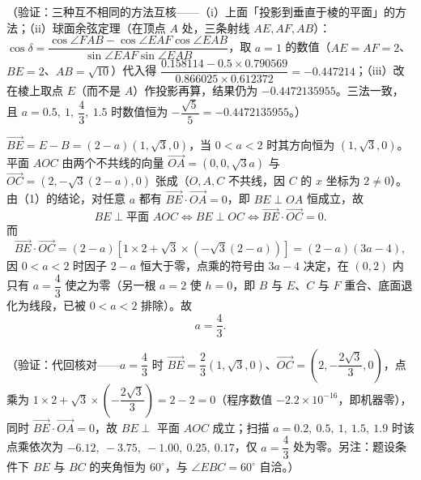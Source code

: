 \begin{answer}
（验证：三种互不相同的方法互核——（i）上面「投影到垂直于棱的平面」的方法；（ii）球面余弦定理（在顶点 \(A\) 处，三条射线 \(AE,AF,AB\)）：\(\cos\delta=\dfrac{\cos\angle FAB-\cos\angle EAF\cos\angle EAB}{\sin\angle EAF\sin\angle EAB}\)，取 \(a=1\) 的数值（\(AE=AF=2\)、\(BE=2\)、\(AB=\sqrt{10}\)）代入得 \(\dfrac{0.158114-0.5\times0.790569}{0.866025\times0.612372}=-0.447214\)；（iii）改在棱上取点 \(E\)（而不是 \(A\)）作投影再算，结果仍为 \(-0.4472135955\)。三法一致，且 \(a=0.5,\ 1,\ \dfrac{4}{3},\ 1.5\) 时数值恒为 \(-\dfrac{\sqrt{5}}{5}=-0.4472135955\)。）


\(\overrightarrow{BE}=E-B=(2-a)(1,\sqrt{3},0)\)，当 \(0<a<2\) 时其方向恒为 \((1,\sqrt{3},0)\)。平面 \(AOC\) 由两个不共线的向量 \(\overrightarrow{OA}=(0,0,\sqrt{3}a)\) 与 \(\overrightarrow{OC}=\left(2,-\sqrt{3}(2-a),0\right)\) 张成（\(O,A,C\) 不共线，因 \(C\) 的 \(x\) 坐标为 \(2\neq0\)）。由（1）的结论，对任意 \(a\) 都有 \(\overrightarrow{BE}\cdot\overrightarrow{OA}=0\)，即 \(BE\perp OA\) 恒成立，故
\nopagebreak[4]
\[
BE\perp\text{平面 }AOC\iff BE\perp OC\iff\overrightarrow{BE}\cdot\overrightarrow{OC}=0 .
\]
而
\nopagebreak[4]
\[
\overrightarrow{BE}\cdot\overrightarrow{OC}=(2-a)\left[1\times2+\sqrt{3}\times\left(-\sqrt{3}(2-a)\right)\right]=(2-a)(3a-4),
\]
因 \(0<a<2\) 时因子 \(2-a\) 恒大于零，点乘的符号由 \(3a-4\) 决定，在 \((0,2)\) 内只有 \(a=\dfrac{4}{3}\) 使之为零（另一根 \(a=2\) 使 \(h=0\)，即 \(B\) 与 \(E\)、\(C\) 与 \(F\) 重合、底面退化为线段，已被 \(0<a<2\) 排除）。故
\nopagebreak[4]
\[
a=\frac{4}{3}.
\]

（验证：代回核对——\(a=\dfrac{4}{3}\) 时 \(\overrightarrow{BE}=\dfrac{2}{3}(1,\sqrt{3},0)\)、\(\overrightarrow{OC}=\left(2,-\dfrac{2\sqrt{3}}{3},0\right)\)，点乘为 \(1\times2+\sqrt{3}\times\left(-\dfrac{2\sqrt{3}}{3}\right)=2-2=0\)（程序数值 \(-2.2\times10^{-16}\)，即机器零），同时 \(\overrightarrow{BE}\cdot\overrightarrow{OA}=0\)，故 \(BE\perp\) 平面 \(AOC\) 成立；扫描 \(a=0.2,\ 0.5,\ 1,\ 1.5,\ 1.9\) 时该点乘依次为 \(-6.12,\ -3.75,\ -1.00,\ 0.25,\ 0.17\)，仅 \(a=\dfrac{4}{3}\) 处为零。另注：题设条件下 \(BE\) 与 \(BC\) 的夹角恒为 \(60^{\circ}\)，与 \(\angle EBC=60^{\circ}\) 自洽。）




\end{answer}
